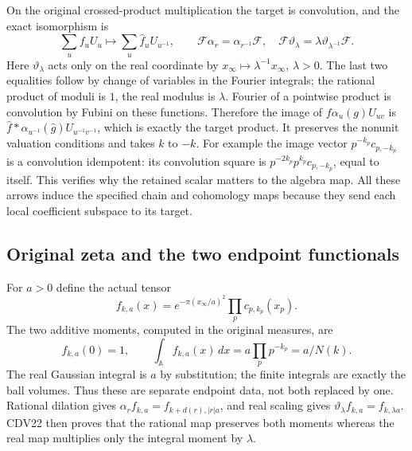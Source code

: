 On the original crossed-product multiplication the target is
convolution, and the exact isomorphism is
\begin{equation}\tag{CDV20}
 \sum_u f_uU_u\longmapsto\sum_u\widehat f_uU_{u^{-1}},\qquad
 \mathcal F\alpha_r=\alpha_{r^{-1}}\mathcal F,
 \quad\mathcal F\vartheta_\lambda
                  =\lambda\vartheta_{\lambda^{-1}}\mathcal F.
\end{equation}
Here $\vartheta_\lambda$ acts only on the real coordinate by
$x_\infty\mapsto\lambda^{-1}x_\infty$, $\lambda>0$.
The last two equalities follow by change of variables in the Fourier
integrals; the rational product of moduli is $1$, the real modulus
is $\lambda$. Fourier of a pointwise product is convolution by
Fubini on these functions. Therefore the image of
$f\alpha_u(g)U_{uv}$ is
$\widehat f*\alpha_{u^{-1}}(\widehat g)U_{u^{-1}v^{-1}}$,
which is exactly the target product. It preserves the nonunit
valuation conditions and takes $k$ to $-k$.
For example the image vector $p^{-k_p}c_{p,-k_p}$ is a
convolution idempotent: its convolution square is
$p^{-2k_p}p^{k_p}c_{p,-k_p}$, equal to itself. This verifies
why the retained scalar matters to the algebra map.
All these arrows induce the specified chain and cohomology maps
because they send each local coefficient subspace to its target.

\subsection{Original zeta and the two endpoint functionals}

For $a>0$ define the actual tensor
\begin{equation}\tag{CDV21}
 f_{k,a}(x)=e^{-\pi(x_\infty/a)^2}\prod_p c_{p,k_p}(x_p).
\end{equation}
The two additive moments, computed in the original measures, are
\begin{equation}\tag{CDV22}
 f_{k,a}(0)=1,\qquad \int_{\mathbb A}f_{k,a}(x)\,dx
                         =a\prod_pp^{-k_p}=a/N(k).
\end{equation}
The real Gaussian integral is $a$ by substitution; the finite
integrals are exactly the ball volumes. Thus these are separate
endpoint data, not both replaced by one. Rational dilation gives
$\alpha_rf_{k,a}=f_{k+d(r),|r|a}$, and real scaling gives
$\vartheta_\lambda f_{k,a}=f_{k,\lambda a}$. CDV22 then proves
that the rational map preserves both moments whereas the real map
multiplies only the integral moment by $\lambda$.

